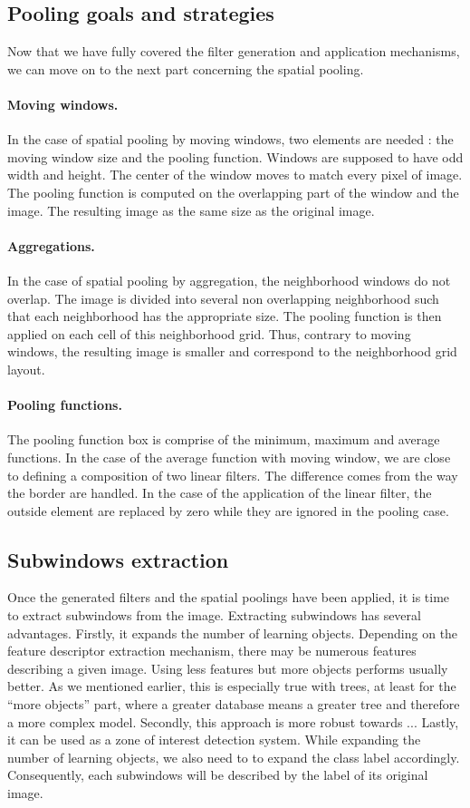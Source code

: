 \documentclass[a4paper]{report}
\begin{document}
		\subsection{Pooling goals and strategies}
		Now that we have fully covered the filter generation and application mechanisms, we can move on to the next part concerning the spatial pooling.
			\paragraph{Moving windows.}
			In the case of spatial pooling by moving windows, two elements are needed : the moving window size and the pooling function. Windows are supposed to have odd width and height. The center of the window moves to match every pixel of image. The pooling function is computed on the overlapping part of the window and the image. The resulting image as the same size as the original image.
			\paragraph{Aggregations.}
			In the case of spatial pooling by aggregation, the neighborhood windows do not overlap. The image is divided into several non overlapping neighborhood such that each neighborhood has the appropriate size. The pooling function is then applied on each cell of this neighborhood grid. Thus, contrary to moving windows, the resulting image is smaller and correspond to the neighborhood grid layout.
			\paragraph{Pooling functions.}
			The pooling function box is comprise of the minimum, maximum and average functions. In the case of the average function with moving window, we are close to defining a composition of two linear filters. The difference comes from the way the border are handled. In the case of the application of the linear filter, the outside element are replaced by zero while they are ignored in the pooling case.
			
		\subsection{Subwindows extraction}
		Once the generated filters and the spatial poolings have been applied, it is time to extract subwindows from the image. Extracting subwindows has several advantages. 
		Firstly, it expands the number of learning objects. Depending on the feature descriptor extraction mechanism, there may be numerous features describing a given image. Using less features but more objects performs usually better. As we mentioned earlier, this is especially true with trees, at least for the ``more objects'' part, where a greater database means a greater tree and therefore a more complex model.
		Secondly, this approach is more robust towards ...%
		Lastly, it can be used as a zone of interest detection system. %
		While expanding the number of learning objects, we also need to to expand the class label accordingly. Consequently, each subwindows will be described by the label of its original image.
		
\end{document}
